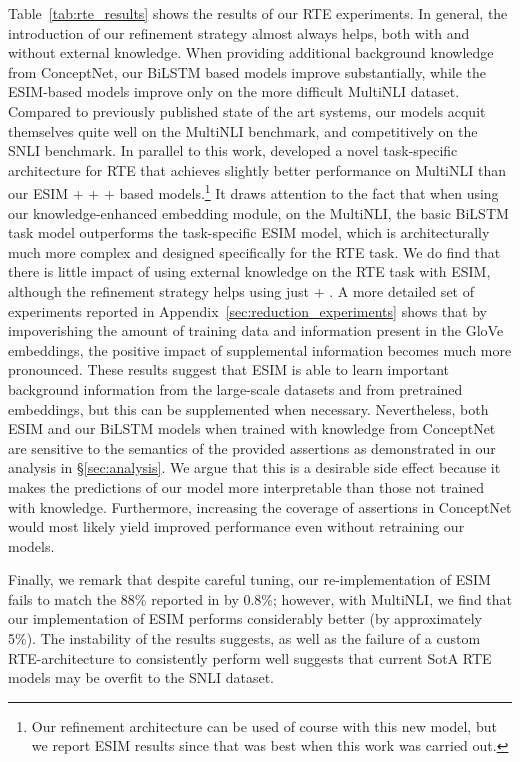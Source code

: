 \documentclass[11pt,a4paper]{article}
\begin{document}
Table~\ref{tab:rte_results} shows the results of our RTE experiments. In general, the introduction of our refinement strategy almost always helps, both with and without external knowledge. When providing additional background knowledge from ConceptNet, our BiLSTM based models improve substantially, while the ESIM-based models improve only on the more difficult MultiNLI dataset. Compared to previously published state of the art systems, our models acquit themselves quite well on the MultiNLI benchmark, and competitively on the SNLI benchmark. In parallel to this work, \citet{gong2017natural} developed a novel task-specific architecture for RTE that achieves slightly better performance on MultiNLI than our ESIM +  +  +  based models.\footnote{Our refinement architecture can be used of course with this new model, but we report ESIM results since that was best when this work was carried out.} It draws attention to the fact that when using our knowledge-enhanced embedding module, on the MultiNLI, the basic BiLSTM task model outperforms the task-specific ESIM model, which is architecturally much more complex and designed specifically for the RTE task.
We do find that there is little impact of using external knowledge on the RTE task with ESIM, although the refinement strategy helps using just  + . A more detailed set of experiments reported in Appendix~\ref{sec:reduction_experiments} shows that by impoverishing the amount of training data and information present in the GloVe embeddings, the positive impact of supplemental information becomes much more pronounced. These results suggest that ESIM is able to learn important background information from the large-scale datasets and from pretrained embeddings, but this can be supplemented when necessary. Nevertheless, both ESIM and our BiLSTM models when trained with knowledge from ConceptNet are sensitive to the semantics of the provided assertions as demonstrated in our analysis in \S\ref{sec:analysis}. We argue that this is a desirable side effect because it makes the predictions of our model more interpretable than those not trained with knowledge. Furthermore, increasing the coverage of assertions in ConceptNet would most likely yield improved performance even without retraining our models.

Finally, we remark that despite careful tuning, our re-implementation of ESIM fails to match the 88\% reported in \citet{Chen2017_ESIM} by 0.8\%; however, with MultiNLI, we find that our implementation of ESIM performs considerably better (by approximately 5\%). The instability of the results suggests, as well as the failure of a custom RTE-architecture to consistently perform well suggests that current SotA RTE models may be overfit to the SNLI dataset.
\end{document}
